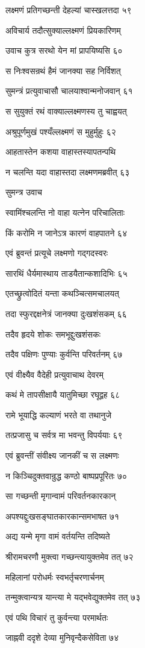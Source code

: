 लक्ष्मणं प्रतिगच्छन्ती देहल्यां चास्खलत्तदा ५९

अविचार्य तदौत्सुक्याल्लक्ष्मणं प्रियकारिणम्

उवाच कुत्र सरथो येन मां प्रापयिष्यसि ६०

स निःश्वसन्रथं हैमं जानक्या सह निर्विशत्

सुमन्त्रं प्रत्युवाचासौ चालयाश्वान्मनोजवान् ६१

स सुयुक्तं रथं वाक्याल्लक्ष्मणस्य तु चाह्वयत्

अश्रुपूर्णमुखं पश्यँल्लक्ष्मणं स मुहुर्मुहुः ६२

आहतास्तेन कशया वाहास्तस्यापतन्पथि

न चलन्ति यदा वाहास्तदा लक्ष्मणमब्रवीत् ६३

सुमन्त्र उवाच

स्वामिंश्चलन्ति नो वाहा यत्नेन परिचालिताः

किं करोमि न जानेऽत्र कारणं वाहपातने ६४

एवं ब्रुवन्तं प्रत्यूचे लक्ष्मणो गद्गदस्वरः

सारथिं धैर्यमास्थाय ताडयैतान्कशादिभिः ६५

एतच्छ्रुत्वोदितं यन्ता कथञ्चित्समचालयत्

तदा स्फुरद्दक्षनेत्रं जानक्या दुःखशंसकम् ६६

तदैव हृदये शोकः समभूद्दुःखशंसकः

तदैव पक्षिणः पुण्याः कुर्वन्ति परिवर्तनम् ६७

एवं वीक्ष्यैव वैदेही प्रत्युवाचाथ देवरम्

कथं मे तापसीक्षायै यातुमिच्छा रघूद्वह ६८

रामे भूयाद्धि कल्याणं भरते वा तथानुजे

तत्प्रजासु च सर्वत्र मा भवन्तु विपर्ययाः ६९

एवं ब्रुवन्तीं संवीक्ष्य जानकीं च स लक्ष्मणः

न किञ्चिदुक्तवान्रुद्ध कण्ठो बाष्पप्रपूरितः ७०

सा गच्छन्ती मृगान्वामं परिवर्तनकारकान्

अपश्यद्दुःखसङ्घातकारकान्समभाषत ७१

अद्य यन्मे मृगा वामं वर्तयन्ति तदिष्यते

श्रीरामचरणौ मुक्त्वा गच्छन्त्यायुक्तमेव तत् ७२

महिलानां परोधर्मः स्वभर्तृचरणार्चनम्

तन्मुक्त्वान्यत्र यान्त्या मे यद्भवेद्युक्तमेव तत् ७३

एवं पथि विचारं तु कुर्वन्त्या परमार्थतः

जाह्नवी ददृशे देव्या मुनिवृन्दैकसेविता ७४

